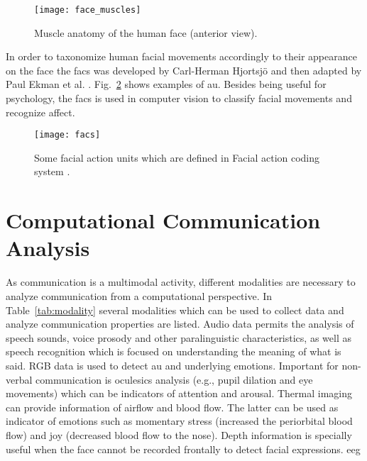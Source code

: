 \begin{figure}
    \centering
    \texttt{[image: face\_muscles]}
    \caption{Muscle anatomy of the human face (anterior view).\cite{Prendergast2013anatomy}}
    \label{fig:facemuscles}
\end{figure}

In order to taxonomize human facial movements accordingly to their appearance on the face the \gls{facs} was developed by Carl-Herman Hjortsj{\"{o}} and then adapted by Paul Ekman et al. \cite{Ekman1977}. Fig.~\ref{fig:facs} shows examples of \gls{au}. Besides being useful for psychology, the \gls{facs} is used in computer vision to classify facial movements and recognize affect.  


\begin{figure}
    \centering
    \texttt{[image: facs]}
    \caption{Some facial action units which are defined in Facial action coding system \cite{Ekman1977}.}
    \label{fig:facs}
\end{figure}


\section{Computational Communication Analysis }

As communication is a multimodal activity, different modalities are necessary to analyze communication from a computational perspective. In Table~\ref{tab:modality} several modalities which can be used to collect data and analyze communication properties are listed. Audio data permits the analysis of speech sounds, voice prosody and other paralinguistic characteristics, as well as speech recognition which is focused on understanding the meaning of what is said. RGB data is used to detect \gls{au} and underlying emotions. Important for non-verbal communication is oculesics analysis (e.g., pupil dilation and eye movements) which can be indicators of attention and arousal. Thermal imaging can provide information of airflow and blood flow. The latter can be used as indicator of emotions such as momentary stress (increased the periorbital blood flow) and joy (decreased blood flow to the nose)\cite{Corneanu2016survey}. Depth information is specially useful when the face cannot be recorded frontally to detect facial expressions. \gls{eeg}


